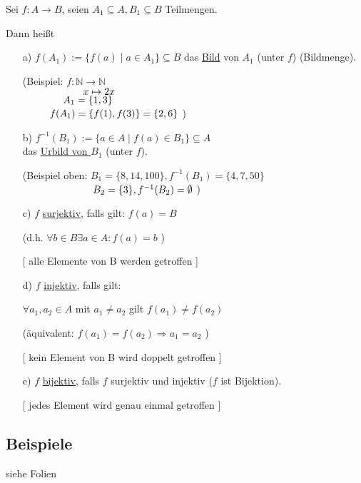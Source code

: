 \documentclass[a4paper, 12pt, twoside] {article}
\begin{document}
Sei $f \colon A \rightarrow B$, seien $A_1 \subseteq A, B_1 \subseteq B$ Teilmengen.

Dann heißt

\begin{itemize}
\item[a)] $f(A_1) := \{f(a) \mid a \in A_1\} \subseteq B$ das \underline{Bild} von $A_1$ (unter $f$) (Bildmenge).

(Beispiel: $f \colon \mathbb{N} \rightarrow \mathbb{N}$ \\
$\text{\qquad\qquad\qquad} x \mapsto 2x$ \\
$\text{\qquad\qquad} A_1 = \{1,3\}$ \\
$\text{\space\qquad\space} f(A_1) = \{f(1), f(3)\} = \{2,6\}$ )

\item[b)] $f^{-1}(B_1) := \{a \in A \mid f(a) \in B_1\} \subseteq A$ \\
das \underline{Urbild von $B_1$} (unter $f$).

(Beispiel oben: $B_1 = \{8,14,100\}, f^{-1}(B_1) = \{4,7,50\}$ \\
$\text{\qquad\qquad\qquad\quad} B_2 = \{3\}, f^{-1}(B_2) = \emptyset$ )

\item[c)] $f$ \underline{surjektiv}, falls gilt: $f(a) = B$

(d.h. $\forall b \in B \exists a \in A : f(a) = b$ )

{\color{orange} [ alle Elemente von B werden getroffen ] }

\item[d)] $f$ \underline{injektiv}, falls gilt:

$\forall a_1, a_2 \in A$ mit $a_1 \neq a_2$ gilt $f(a_1) \neq f(a_2)$

(äquivalent: $f(a_1) = f(a_2) \Rightarrow a_1 = a_2$ )

{\color{orange} [ kein Element von B wird doppelt getroffen ] }

\item[e)] $f$ \underline{bijektiv}, falls $f$ surjektiv und injektiv ($f$ ist Bijektion).

{\color{orange} [ jedes Element wird genau einmal getroffen ] }

\end{itemize}

\subsection{Beispiele} siehe Folien
\end{document}
